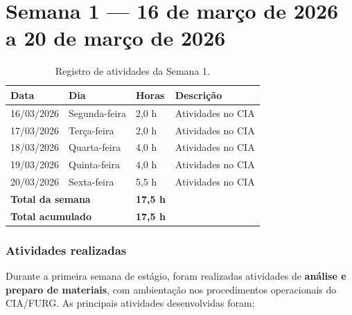 
\section{Semana 1 --- 16 de março de 2026 a 20 de março de 2026}

\begin{table}[H]
\centering
\caption{Registro de atividades da Semana 1.}
\begin{tabular}{llll}
\toprule
\textbf{Data} & \textbf{Dia} & \textbf{Horas} & \textbf{Descrição} \\
\midrule
16/03/2026 & Segunda-feira & 2,0 h & Atividades no CIA \\
17/03/2026 & Terça-feira & 2,0 h & Atividades no CIA \\
18/03/2026 & Quarta-feira & 4,0 h & Atividades no CIA \\
19/03/2026 & Quinta-feira & 4,0 h & Atividades no CIA \\
20/03/2026 & Sexta-feira & 5,5 h & Atividades no CIA \\
\midrule
\multicolumn{2}{l}{\textbf{Total da semana}} & \textbf{17,5 h} & \\
\multicolumn{2}{l}{\textbf{Total acumulado}} & \textbf{17,5 h} & \\
\bottomrule
\end{tabular}
\end{table}

\subsubsection*{Atividades realizadas}

Durante a primeira semana de estágio, foram realizadas atividades de
\textbf{análise e preparo de materiais}, com ambientação nos procedimentos
operacionais do CIA/FURG. As principais atividades desenvolvidas foram:


